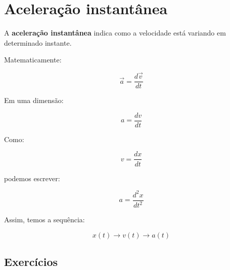 \documentclass[a4paper,12pt]{article}
\begin{document}
\section{Aceleração instantânea}

\begin{ideia}

A \textbf{aceleração instantânea} indica como a velocidade está
variando em determinado instante.

Matematicamente:

\[
\boxed{
\vec a=
\frac{d\vec v}{dt}
}
\]

Em uma dimensão:

\[
\boxed{
a=
\frac{dv}{dt}
}
\]

Como:

\[
v=\frac{dx}{dt}
\]

podemos escrever:

\[
\boxed{
a=
\frac{d^2x}{dt^2}
}
\]

Assim, temos a sequência:

\[
\boxed{
x(t)
\longrightarrow
v(t)
\longrightarrow
a(t)
}
\]

\end{ideia}


\subsection*{Exercícios}
\end{document}
